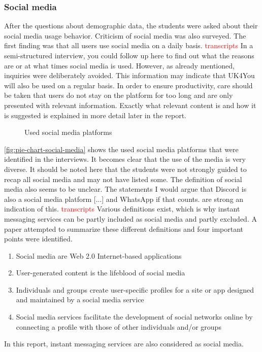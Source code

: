 \subsubsection{Social media}\label{sec:social-media}
After the questions about demographic data, the students were asked about their social media usage behavior.
Criticism of social media was also surveyed.
The first finding was that all users use social media on a daily basis. \textcolor{red}{transcripts}
In a semi-structured interview, you could follow up here to find out what the reasons are or at what times social media is used.
However, as already mentioned, inquiries were deliberately avoided.
This information may indicate that UK4You will also be used on a regular basis.
In order to ensure productivity, care should be taken that users do not stay on the platform for too long and are only presented with relevant information.
Exactly what relevant content is and how it is suggested is explained in more detail later in the report.\\

\begin{figure}[ht]
    \centering
    \caption{Used social media platforms}
    \label{fig:pie-chart-social-media}
\end{figure}

\autoref{fig:pie-chart-social-media} shows the used social media platforms that were identified in the interviews.
It becomes clear that the use of the media is very diverse.
It should be noted here that the students were not strongly guided to recap all social media and may not have listed some.
The definition of social media also seems to be unclear.
The statements \glqq I would argue that Discord is also a social media platform [...]\grqq{} and \glqq [...] WhatsApp if that counts.\grqq{} are strong an indication of this. \textcolor{red}{transcripts}
Various definitions exist, which is why instant messaging services can be partly included as social media and partly excluded.
A paper attempted to summarize these different definitions and four important points were identified\cite{social-media-definition}.
\begin{enumerate}
    \item Social media are Web 2.0 Internet-based applications
    \item User-generated content is the lifeblood of social media
    \item Individuals and groups create user-specific profiles for a site or app designed and maintained by a social media service
    \item Social media services facilitate the development of social networks online by connecting a profile with those of other individuals and/or groups
\end{enumerate}
In this report, instant messaging services are also considered as social media.\\

